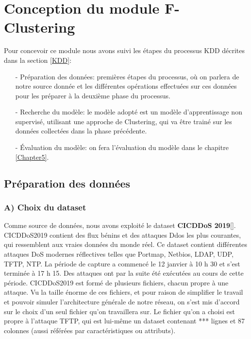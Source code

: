\newpage
\section{Conception du module F-Clustering}
\label{F-Clustering}
Pour concevoir ce module nous avons suivi les étapes du processus KDD décrites dans la section \ref{KDD}:\\
\begin{itemize}
\item[-] Préparation des données: premières étapes du processus, où on parlera de notre source donnée et les différentes opérations effectuées sur ces données pour les préparer à la deuxième phase du processus. \\
\item[-] Recherche du modèle: le modèle adopté est un modèle d'apprentissage non supervisé, utilisant une approche de Clustering, qui va être trainé sur les données collectées dans la phase précédente.\\
\item[-] Évaluation du modèle: on fera l'évaluation du modèle dans le chapitre \ref{Chapter5}.
\end{itemize}

\subsection{Préparation des données}
\subsubsection{A) Choix du dataset }
Comme source de données, nous avons exploité le dataset \textbf{ CICDDoS 2019}[\cite{21}]. CICDDoS2019 contient des flux bénins et des attaques Ddos les plus courantes, qui ressemblent aux vraies données du monde réel. Ce dataset contient différentes attaques DoS modernes réflectives telles que Portmap, Netbios, LDAP, UDP, TFTP, NTP. La période de capture a commencé le 12 janvier à 10 h 30 et s’est terminée à 17 h 15. Des attaques ont par la suite été exécutées au cours de cette période.
\newpage
CICDDoS2019 est formé de plusieurs fichiers, chacun propre à une attaque. Vu la taille énorme de ces fichiers, et pour raison de simplifier le travail et pouvoir simuler l'architecture générale de notre réseau, on s'est mis d'accord sur le choix d'un seul fichier qu'on travaillera sur. Le fichier qu'on a choisi est propre à l'attaque TFTP, qui est lui-même un dataset contenant *** lignes et 87 colonnes (aussi référées par caractéristiques ou attributs).

